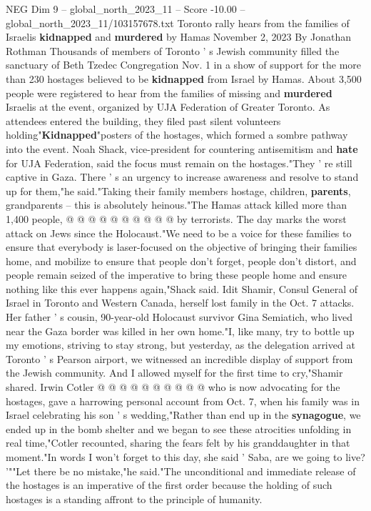 \begin{textsample}{NEG Dim 9 – global\_north\_2023\_11 – Score -10.00 – global\_north\_2023\_11/103157678.txt}  \label{ex:f9_neg_061}
Toronto rally hears from the families of Israelis \textbf{kidnapped} and \textbf{murdered} by Hamas November 2, 2023 By Jonathan Rothman Thousands of members of Toronto ' s Jewish community filled the sanctuary of Beth Tzedec Congregation Nov. 1 in a show of support for the more than 230 hostages believed to be \textbf{kidnapped} from Israel by Hamas.
About 3,500 people were registered to hear from the families of missing and \textbf{murdered} Israelis at the event, organized by UJA Federation of Greater Toronto.
As attendees entered the building, they filed past silent volunteers holding"\textbf{Kidnapped}"posters of the hostages, which formed a sombre pathway into the event.
Noah Shack, vice-president for countering antisemitism and \textbf{hate} for UJA Federation, said the focus must remain on the hostages."They ' re still captive in Gaza.
There ' s an urgency to increase awareness and resolve to stand up for them,"he said."Taking their family members hostage, children, \textbf{parents}, grandparents -- this is absolutely heinous."The Hamas attack killed more than 1,400 people, @ @ @ @ @ @ @ @ @ @ by terrorists.
The day marks the worst attack on Jews since the Holocaust."We need to be a voice for these families to ensure that everybody is laser-focused on the objective of bringing their families home, and mobilize to ensure that people don't forget, people don't distort, and people remain seized of the imperative to bring these people home and ensure nothing like this ever happens again,"Shack said.
Idit Shamir, Consul General of Israel in Toronto and Western Canada, herself lost family in the Oct. 7 attacks.
Her father ' s cousin, 90-year-old Holocaust survivor Gina Semiatich, who lived near the Gaza border was killed in her own home."I, like many, try to bottle up my emotions, striving to stay strong, but yesterday, as the delegation arrived at Toronto ' s Pearson airport, we witnessed an incredible display of support from the Jewish community.
And I allowed myself for the first time to cry,"Shamir shared.
Irwin Cotler @ @ @ @ @ @ @ @ @ @ who is now advocating for the hostages, gave a harrowing personal account from Oct. 7, when his family was in Israel celebrating his son ' s wedding,"Rather than end up in the \textbf{synagogue}, we ended up in the bomb shelter and we began to see these atrocities unfolding in real time,"Cotler recounted, sharing the fears felt by his granddaughter in that moment."In words I won't forget to this day, she said ' Saba, are we going to live? '""Let there be no mistake,"he said."The unconditional and immediate release of the hostages is an imperative of the first order because the holding of such hostages is a standing affront to the principle of humanity.

\end{textsample}
